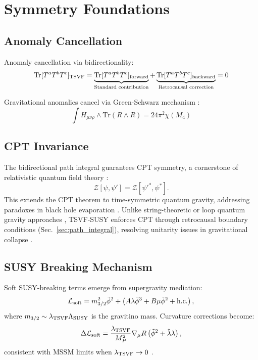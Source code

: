 \documentclass[twocolumn,superscriptaddress,floatfix]{revtex4-2}
\begin{document}
\section{Symmetry Foundations}  
\label{sec:symmetry}   

\subsection{Anomaly Cancellation}
\label{subsec:anomaly}
Anomaly cancellation via bidirectionality:
\begin{equation}
\text{Tr}[T^aT^bT^c]_{\rm TSVF} = \underbrace{\text{Tr}[T^aT^bT^c]_{\rm forward}}_{\text{Standard contribution}} + \underbrace{\text{Tr}[T^aT^bT^c]_{\rm backward}}_{\text{Retrocausal correction}} = 0
\label{eq:anomaly_cancellation}
\end{equation}

Gravitational anomalies cancel via Green-Schwarz mechanism \cite{Green:1984}:
\begin{equation}
\int H_{\mu\nu\rho} \wedge \text{Tr}(R \wedge R) = 24\pi^2\chi(M_4)
\label{eq:green_schwarz}
\end{equation}

\subsection{CPT Invariance}  
\label{subsec:cpt}    

The bidirectional path integral guarantees CPT symmetry, a cornerstone of relativistic quantum field theory \cite{Luders1957,Streater1964}:  
\begin{equation}  
\mathcal{Z}[\psi, \psi'] = \mathcal{Z}[\psi'^*, \psi^*].  
\label{eq:cpt_invariance}   
\end{equation}  
This extends the CPT theorem \cite{Pauli1955} to time-symmetric quantum gravity, addressing paradoxes in black hole evaporation \cite{Hawking1976}. Unlike string-theoretic or loop quantum gravity approaches \cite{Polchinski1998,Rovelli2004}, TSVF-SUSY enforces CPT through retrocausal boundary conditions (Sec.~\ref{sec:path_integral}), resolving unitarity issues in gravitational collapse \cite{Mathur2009}.  

\subsection{SUSY Breaking Mechanism}
\label{subsec:susy_breaking}
Soft SUSY-breaking terms emerge from supergravity mediation:
\begin{equation}
\mathcal{L}_{\rm soft} = m_{3/2}^2 \tilde{\phi}^2 + \left( A\lambda \tilde{\phi}^3 + B\mu \tilde{\phi}^2 + \text{h.c.} \right),
\label{eq:soft_breaking}
\end{equation}
where $m_{3/2} \sim \lambda_{\rm TSVF}\Lambda_{\rm SUSY}$ is the gravitino mass. Curvature corrections become:
\begin{equation}
\Delta\mathcal{L}_{\rm soft} = \frac{\lambda_{\rm TSVF}}{M_P^2} \nabla_\mu R \left( \tilde{\phi}^2 + \tilde{\lambda}\lambda \right),
\label{eq:curvature_correction}
\end{equation}
consistent with MSSM limits when $\lambda_{\rm TSVF} \to 0$ \cite{Martin:1997, Nilles:1984}.
\end{document}
